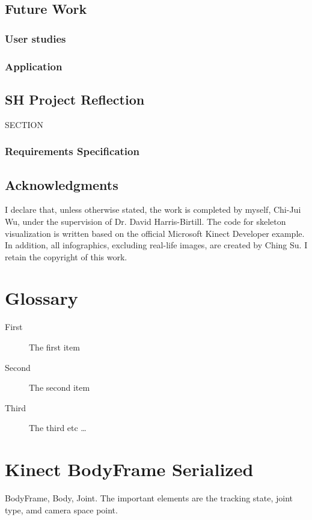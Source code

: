 \documentclass{sigchi}
\begin{document}
\section{Future Work}

\subsection{User studies}

\subsection{Application}

\section{SH Project Reflection}

SECTION

\subsection{Requirements Specification}

\section{Acknowledgments}

I declare that, unless otherwise stated, the work is completed by myself, Chi-Jui Wu, under the supervision of Dr. David Harris-Birtill. The code for skeleton visualization is written based on the official Microsoft Kinect Developer example.
In addition, all infographics, excluding real-life images, are created by Ching Su. I retain the copyright of this work.

\balance{}




\begin{appendices}

\chapter{Glossary}

\begin{description}
  \item[First] The first item
  \item[Second] The second item
  \item[Third] The third etc \ldots
\end{description}

\chapter{Kinect BodyFrame Serialized}

BodyFrame, Body, Joint. The important elements are the tracking state, joint type, amd camera space point.

\cite{microsoft_kinect_namespace}

\end{appendices}
\end{document}
